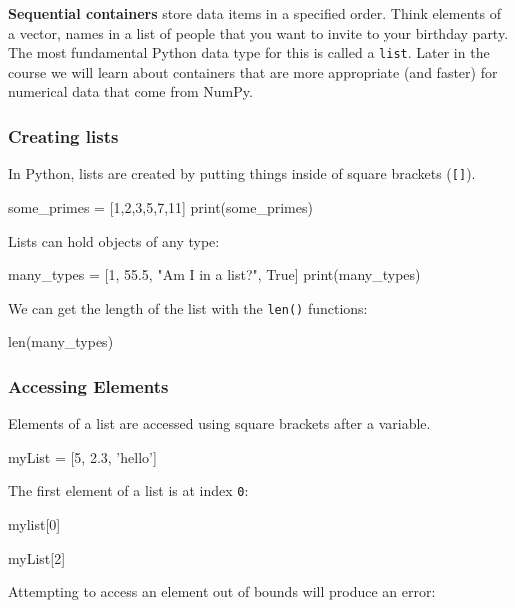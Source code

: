 \documentclass[12pt]{article} \newif\ifsolution\solutiontrue %
\begin{document}
\textbf{Sequential containers} store data items in a specified order.
Think elements of a vector, names in a list of people that you want to
invite to your birthday party. The most fundamental Python data type for
this is called a \texttt{list}. Later in the course we will learn about
containers that are more appropriate (and faster) for numerical data
that come from NumPy.

\subsubsection{Creating lists}\label{creating-lists}

In Python, lists are created by putting things inside of square brackets
(\texttt{{[}{]}}).

\begin{python}
some_primes = [1,2,3,5,7,11] print(some_primes)
\end{python}

Lists can hold objects of any type:

\begin{python}
many_types = [1, 55.5, "Am I in a list?", True] print(many_types)
\end{python}

We can get the length of the list with the \texttt{len()} functions:

\begin{python}
len(many_types)
\end{python}

\subsubsection{Accessing Elements}\label{accessing-elements}

Elements of a list are accessed using square brackets after a variable.

\begin{python}
myList = [5, 2.3, 'hello']
\end{python}

The first element of a list is at index \texttt{0}:

\begin{python}
mylist[0]
\end{python}

\begin{python}
myList[2]
\end{python}

Attempting to access an element out of bounds will produce an error:
\end{document}

